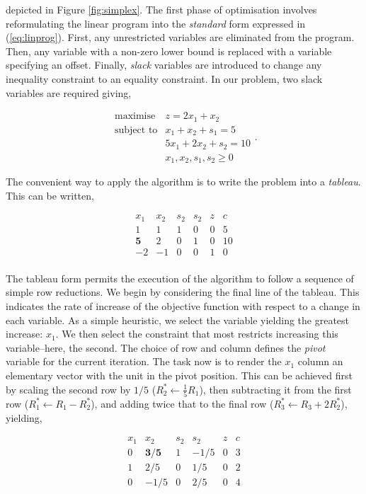 \documentclass[11pt]{amsart}
\begin{document}
depicted in Figure \ref{fig:simplex}. The first phase of optimisation involves reformulating the linear program into the \emph{standard} form expressed in (\ref{eq:linprog}). First, any unrestricted variables are eliminated from the program. Then, any variable with a non-zero lower bound is replaced with a variable specifying an offset. Finally, \emph{slack} variables are introduced to change any inequality constraint to an equality constraint. In our problem, two slack variables are required giving,

$$
\begin{array}{rl}
\text{maximise} & z = 2x_1 + x_2 \\
\text{subject to} & x_1 + x_2 + s_1 = 5 \\
& 5x_1 + 2x_2 + s_2 = 10 \\
& x_1, x_2, s_1, s_2 \geq 0
\end{array}.
$$

The convenient way to apply the algorithm is to write the problem into a \emph{tableau}. This can be written,

$$
\begin{array}{rrrrr|r}
x_1&x_2&s_2&s_2&z&c \\
\hline
1&1&1&0&0&5 \\
\mathbf{5}&2&0&1&0&10 \\
\hline
-2&-1&0&0&1&0 \\
\end{array}
$$

The tableau form permits the execution of the algorithm to follow a sequence of simple row reductions. We begin by considering the final line of the tableau. This indicates the rate of increase of the objective function with respect to a change in each variable. As a simple heuristic, we select the variable yielding the greatest increase: $x_1$. We then select the constraint that most restricts increasing this variable--here, the second. The choice of row and column defines the \emph{pivot} variable for the current iteration. The task now is to render the $x_1$ column an elementary vector with the unit in the pivot position. This can be achieved first by scaling the second row by $1/5$ ($R_2^* \leftarrow \frac{1}{5}R_1 $), then subtracting it from the first row ($R_1^* \leftarrow R_1 - R_2^*$), and adding twice that to the final row ($R_3^* \leftarrow R_3 + 2R_2^*$), yielding,

$$
\begin{array}{rrrrr|r}
x_1&x_2&s_2&s_2&z&c \\
\hline
0&\mathbf{3/5}&1&-1/5&0&3 \\
1&2/5&0&1/5&0&2 \\
\hline
0&-1/5&0&2/5&0&4 \\
\end{array}
$$
\end{document}
